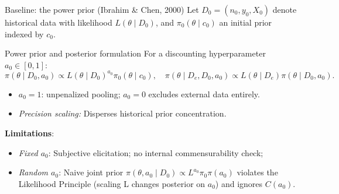 \documentclass[t]{beamer}
\begin{document}
\begin{frame}{Baseline: the power prior (Ibrahim \& Chen, 2000)}
    \vspace{0.1cm}
    Let $D_0 = (n_0, y_0, X_0)$ denote historical data with likelihood $L(\theta \mid D_0)$, and $\pi_0(\theta \mid c_0)$ an initial prior indexed by $c_0$.

    \begin{block}{Power prior and posterior formulation}
    For a discounting hyperparameter $a_0 \in [0, 1]$:
    \begin{equation*}
        \pi(\theta \mid D_0, a_0) \propto L(\theta \mid D_0)^{a_0} \pi_0(\theta \mid c_0), \quad
        \pi(\theta \mid D_e, D_0, a_0) \propto L(\theta \mid D_e) \pi(\theta \mid D_0, a_0).
    \end{equation*}
    \end{block}

    \begin{itemize}
        \item $a_0 = 1$: unpenalized pooling; $a_0 = 0$ excludes external data entirely.
        \item \textit{Precision scaling:} Disperses historical prior concentration.
    \end{itemize}

    \vspace{0.15cm}
    \textbf{Limitations}:
    \begin{itemize}
        \setlength{\itemsep}{0.1cm}
        \item \emph{Fixed $a_0$}: Subjective elicitation; no internal commensurability check;
        \item \emph{Random $a_0$}: Naive joint prior $\pi(\theta, a_0 \mid D_0) \propto L^{a_0} \pi_0 \pi(a_0)$ violates the Likelihood Principle (scaling L changes posterior on $a_0$) and ignores $C(a_0)$.
    \end{itemize}
\end{frame}
\end{document}
